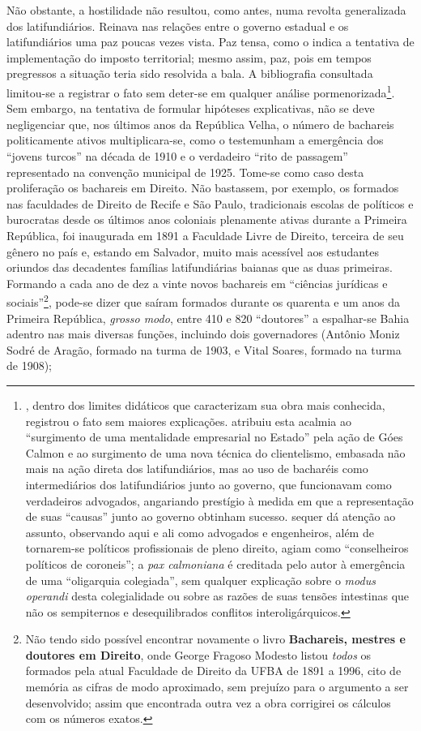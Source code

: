 Não obstante, a hostilidade não resultou, como antes, numa revolta generalizada dos latifundiários. Reinava nas relações entre o governo estadual e os latifundiários uma paz poucas vezes vista. Paz tensa, como o indica a tentativa de implementação do imposto territorial; mesmo assim, paz, pois em tempos pregressos a situação teria sido resolvida a bala. A bibliografia consultada limitou-se a registrar o fato sem deter-se em qualquer análise pormenorizada\footnote{, dentro dos limites didáticos que caracterizam sua obra mais conhecida, registrou o fato sem maiores explicações.  atribuiu esta acalmia ao ``surgimento de uma mentalidade empresarial no Estado'' pela ação de Góes Calmon e ao surgimento de uma nova técnica do clientelismo, embasada não mais na ação direta dos latifundiários, mas ao uso de bacharéis como intermediários dos latifundiários junto ao governo, que funcionavam como verdadeiros advogados, angariando prestígio à medida em que a representação de suas ``causas'' junto ao governo obtinham sucesso.  sequer dá atenção ao assunto, observando aqui e ali como advogados e engenheiros, além de tornarem-se políticos profissionais de pleno direito, agiam como ``conselheiros políticos de coroneis''; a \textit{pax calmoniana} é creditada pelo autor à emergência de uma ``oligarquia colegiada'', sem qualquer explicação sobre o \textit{modus operandi} desta colegialidade ou sobre as razões de suas tensões intestinas que não os sempiternos e desequilibrados conflitos interoligárquicos.}. Sem embargo, na tentativa de formular hipóteses explicativas, não se deve negligenciar que, nos últimos anos da República Velha, o número de bachareis politicamente ativos multiplicara-se, como o testemunham a emergência dos ``jovens turcos'' na década de 1910 e o verdadeiro ``rito de passagem'' representado na convenção municipal de 1925. Tome-se como caso desta proliferação os bachareis em Direito. Não bastassem, por exemplo, os formados nas faculdades de Direito de Recife e São Paulo, tradicionais escolas de políticos e burocratas desde os últimos anos coloniais plenamente ativas durante a Primeira República, foi inaugurada em 1891 a Faculdade Livre de Direito, terceira de seu gênero no país e, estando em Salvador, muito mais acessível aos estudantes oriundos das decadentes famílias latifundiárias baianas que as duas primeiras. Formando a cada ano de dez a vinte novos bachareis em ``ciências jurídicas e sociais''\footnote{Não tendo sido possível encontrar novamente o livro \textbf{Bachareis, mestres e doutores em Direito}, onde George Fragoso Modesto listou \textit{todos} os formados pela atual Faculdade de Direito da UFBA de 1891 a 1996, cito de memória as cifras de modo aproximado, sem prejuízo para o argumento a ser desenvolvido; assim que encontrada outra vez a obra corrigirei os cálculos com os números exatos.}, pode-se dizer que saíram formados durante os quarenta e um anos da Primeira República, \textit{grosso modo}, entre 410 e 820 ``doutores'' a espalhar-se Bahia adentro nas mais diversas funções, incluindo dois governadores (Antônio Moniz Sodré de Aragão, formado na turma de 1903, e Vital Soares, formado na turma de 1908); 


